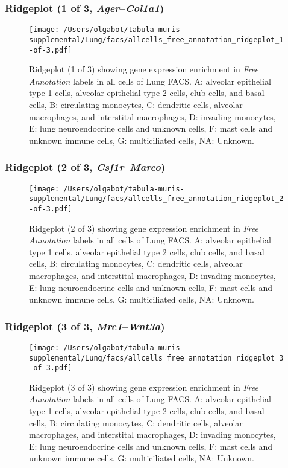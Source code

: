 \subsubsection{Ridgeplot (1 of 3, \emph{Ager}--\emph{Col1a1})}
\begin{figure}[h]
\centering
\texttt{[image: /Users/olgabot/tabula-muris-supplemental/Lung/facs/allcells\_free\_annotation\_ridgeplot\_1-of-3.pdf]}

\caption{ Ridgeplot (1 of 3)  showing gene expression enrichment in \emph{Free Annotation} labels in all cells of Lung FACS. A: alveolar epithelial type 1 cells, alveolar epithelial type 2 cells, club cells, and basal cells, B: circulating monocytes, C: dendritic cells, alveolar macrophages, and interstital macrophages, D: invading monocytes, E: lung neuroendocrine cells and unknown cells, F: mast cells and unknown immune cells, G: multiciliated cells, NA: Unknown.}
\end{figure}


\clearpage

\subsubsection{Ridgeplot (2 of 3, \emph{Csf1r}--\emph{Marco})}
\begin{figure}[h]
\centering
\texttt{[image: /Users/olgabot/tabula-muris-supplemental/Lung/facs/allcells\_free\_annotation\_ridgeplot\_2-of-3.pdf]}

\caption{ Ridgeplot (2 of 3)  showing gene expression enrichment in \emph{Free Annotation} labels in all cells of Lung FACS. A: alveolar epithelial type 1 cells, alveolar epithelial type 2 cells, club cells, and basal cells, B: circulating monocytes, C: dendritic cells, alveolar macrophages, and interstital macrophages, D: invading monocytes, E: lung neuroendocrine cells and unknown cells, F: mast cells and unknown immune cells, G: multiciliated cells, NA: Unknown.}
\end{figure}


\clearpage

\subsubsection{Ridgeplot (3 of 3, \emph{Mrc1}--\emph{Wnt3a})}
\begin{figure}[h]
\centering
\texttt{[image: /Users/olgabot/tabula-muris-supplemental/Lung/facs/allcells\_free\_annotation\_ridgeplot\_3-of-3.pdf]}

\caption{ Ridgeplot (3 of 3)  showing gene expression enrichment in \emph{Free Annotation} labels in all cells of Lung FACS. A: alveolar epithelial type 1 cells, alveolar epithelial type 2 cells, club cells, and basal cells, B: circulating monocytes, C: dendritic cells, alveolar macrophages, and interstital macrophages, D: invading monocytes, E: lung neuroendocrine cells and unknown cells, F: mast cells and unknown immune cells, G: multiciliated cells, NA: Unknown.}
\end{figure}


